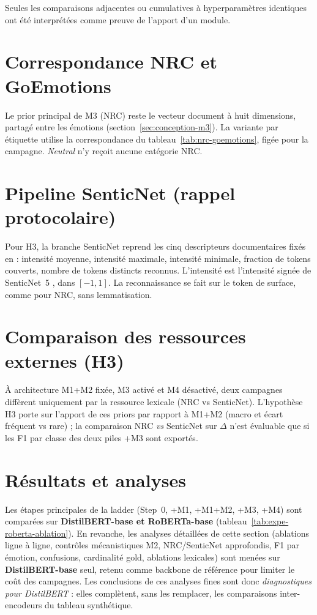 Seules les comparaisons adjacentes ou cumulatives à hyperparamètres
identiques ont été interprétées comme preuve de l'apport d'un module.

\section{Correspondance NRC et GoEmotions}
\label{sec:expe-nrc-mapping}

Le prior principal de M3 (NRC) reste le vecteur document à huit dimensions,
partagé entre les émotions (section~\ref{sec:conception-m3}). La variante
par étiquette utilise la correspondance du
tableau~\ref{tab:nrc-goemotions}, figée pour la campagne. \emph{Neutral}
n'y reçoit aucune catégorie NRC.

\section{Pipeline SenticNet (rappel protocolaire)}
\label{sec:expe-senticnet}

Pour H3, la branche SenticNet reprend les cinq descripteurs documentaires
fixés en  : intensité moyenne, intensité
maximale, intensité minimale, fraction de tokens couverts, nombre de
tokens distincts reconnus. L'intensité est l'intensité signée de
SenticNet~5 \cite{cambria2018senticnet}, dans $[-1, 1]$. La reconnaissance
se fait sur le token de surface, comme pour NRC, sans lemmatisation.

\section{Comparaison des ressources externes (H3)}
\label{sec:expe-ressources-plan}

À architecture M1+M2 fixée, M3 activé et M4 désactivé, deux campagnes
diffèrent uniquement par la ressource lexicale (NRC vs SenticNet).
L'hypothèse H3 porte sur l'apport de ces priors par rapport à M1+M2
(macro et écart fréquent vs rare) ; la comparaison NRC \emph{vs}
SenticNet sur $\Delta$ n'est évaluable que si les F1 par classe des
deux piles +M3 sont exportés.

\section{Résultats et analyses}
\label{sec:expe-analyses-results}

Les étapes principales de la ladder (Step~0, +M1, +M1+M2, +M3, +M4) sont
comparées sur \textbf{DistilBERT-base et RoBERTa-base}
(tableau~\ref{tab:expe-roberta-ablation}). En revanche, les analyses
détaillées de cette section (ablations ligne à ligne, contrôles
mécanistiques M2, NRC/SenticNet approfondis, F1 par émotion, confusions,
cardinalité gold, ablations lexicales) sont menées sur
\textbf{DistilBERT-base} seul, retenu comme backbone de référence pour
limiter le coût des campagnes. Les conclusions de ces analyses fines
sont donc \emph{diagnostiques pour DistilBERT} : elles complètent, sans
les remplacer, les comparaisons inter-encodeurs du tableau
synthétique.

